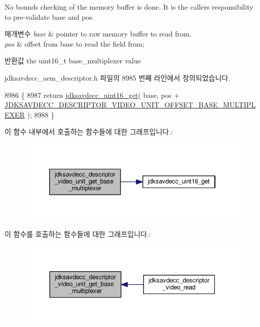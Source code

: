 No bounds checking of the memory buffer is done. It is the caller\textquotesingle{}s responsibility to pre-\/validate base and pos.


\begin{DoxyParams}{매개변수}
{\em base} & pointer to raw memory buffer to read from. \\
\hline
{\em pos} & offset from base to read the field from; \\
\hline
\end{DoxyParams}
\begin{DoxyReturn}{반환값}
the uint16\+\_\+t base\+\_\+multiplexer value 
\end{DoxyReturn}


jdksavdecc\+\_\+aem\+\_\+descriptor.\+h 파일의 8985 번째 라인에서 정의되었습니다.


\begin{DoxyCode}
8986 \{
8987     \textcolor{keywordflow}{return} \hyperlink{group__endian_ga3fbbbc20be954aa61e039872965b0dc9}{jdksavdecc\_uint16\_get}( base, pos + 
      \hyperlink{group__descriptor__video_ga4240bc910ba7b069f1ae91e73e4b1e83}{JDKSAVDECC\_DESCRIPTOR\_VIDEO\_UNIT\_OFFSET\_BASE\_MULTIPLEXER}
       );
8988 \}
\end{DoxyCode}


이 함수 내부에서 호출하는 함수들에 대한 그래프입니다.\+:
\nopagebreak
\begin{figure}[H]
\begin{center}
\leavevmode
\includegraphics[width=346pt]{group__descriptor__video_ga51d7d10430142d5f93784fa4e8ccba7a_cgraph}
\end{center}
\end{figure}




이 함수를 호출하는 함수들에 대한 그래프입니다.\+:
\nopagebreak
\begin{figure}[H]
\begin{center}
\leavevmode
\includegraphics[width=344pt]{group__descriptor__video_ga51d7d10430142d5f93784fa4e8ccba7a_icgraph}
\end{center}
\end{figure}


